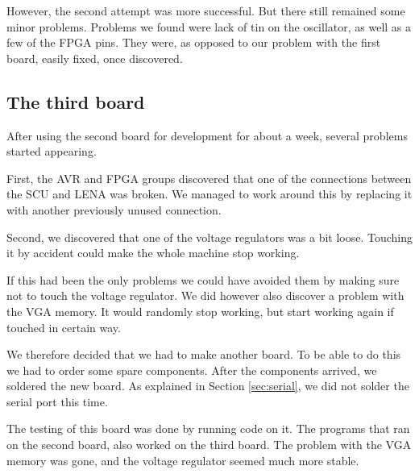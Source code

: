 However, the second attempt was more successful. But there still remained some
minor problems. Problems we found were lack of tin on the oscillator, as well as
a few of the \ac{FPGA} pins. They were, as opposed to our problem with the first
board, easily fixed, once discovered.

\subsection{The third board}
After using the second board for development for about a week, several problems started appearing.

First, the AVR and FPGA groups discovered that one of the connections between the SCU and LENA was broken. We managed to work around this by replacing it with another previously unused connection.

Second, we discovered that one of the voltage regulators was a bit loose. Touching it by accident could make the whole machine stop working.

If this had been the only problems we could have avoided them by making sure not to touch the voltage regulator. We did however also discover a problem with the VGA memory. It would randomly stop working, but start working again if touched in certain way.

We therefore decided that we had to make another board. To be able to do this we had to order some spare components. After the components arrived, we soldered the new board. As explained in Section \ref{sec:serial}, we did not solder the serial port this time.

The testing of this board was done by running code on it. The programs that ran on the second board, also worked on the third board. The problem with the VGA memory was gone, and the voltage regulator seemed much more stable.
